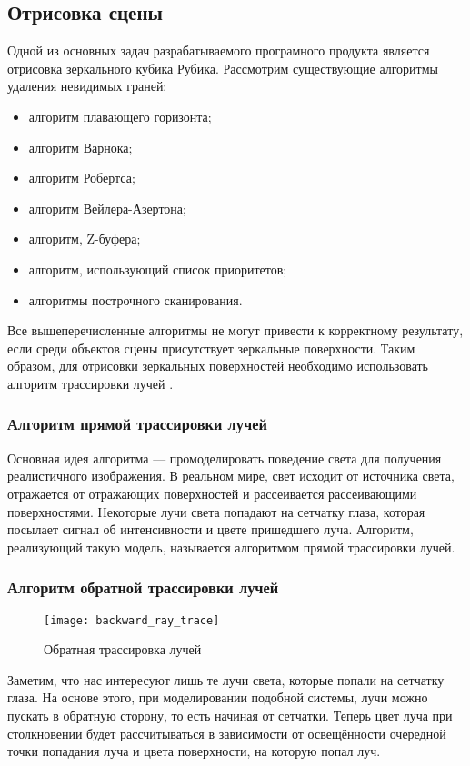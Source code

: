 \subsection{Отрисовка сцены}
Одной из основных задач разрабатываемого програмного продукта является отрисовка зеркального кубика Рубика. Рассмотрим существующие алгоритмы удаления невидимых граней:
\begin{itemize}
	\item алгоритм плавающего горизонта;
	\item алгоритм Варнока;
	\item алгоритм Робертса;
	\item алгоритм Вейлера-Азертона;
	\item алгоритм, Z-буфера;
	\item алгоритм, использующий список приоритетов;
	\item алгоритмы построчного сканирования.
\end{itemize}

Все вышеперечисленные алгоритмы не могут привести к корректному результату, если среди объектов сцены присутствует зеркальные поверхности. Таким образом, для отрисовки зеркальных поверхностей необходимо использовать алгоритм трассировки лучей \cite{bib:computergraphics}.

\subsubsection{Алгоритм прямой трассировки лучей}
Основная идея алгоритма --- промоделировать поведение света для получения реалистичного изображения. В реальном мире, свет исходит от источника света, отражается от отражающих поверхностей и рассеивается рассеивающими поверхностями. Некоторые лучи света попадают на сетчатку глаза, которая посылает сигнал об интенсивности и цвете пришедшего луча. Алгоритм, реализующий такую модель, называется алгоритмом прямой трассировки лучей.

\subsubsection{Алгоритм обратной трассировки лучей}
\begin{figure}[ht]
	\centering
	\texttt{[image: backward\_ray\_trace]}
	\caption{Обратная трассировка лучей}
	\label{fig:backward_ray_trace}
\end{figure}

Заметим, что нас интересуют лишь те лучи света, которые попали на сетчатку глаза. На основе этого, при моделировании подобной системы, лучи можно пускать в обратную сторону, то есть начиная от сетчатки. Теперь цвет луча при столкновении будет рассчитываться в зависимости от освещённости очередной точки попадания луча и цвета поверхности, на которую попал луч.

